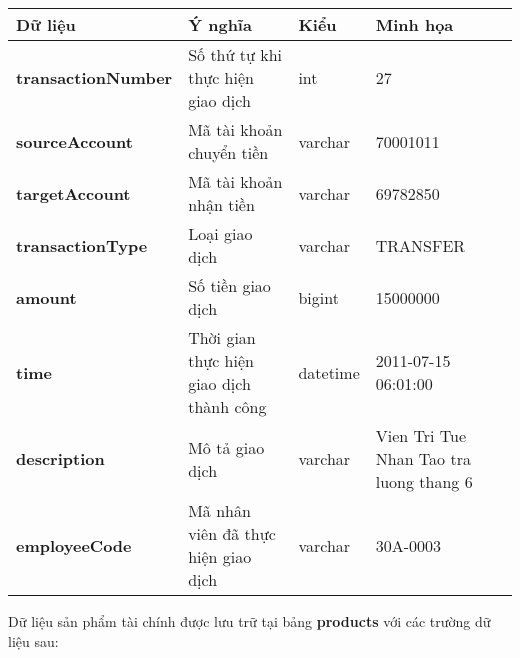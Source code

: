 \begin{center}
    \begin{tabular}{ | m{9em} | m{15em}| m{5em} | m{5em} | } 
    \hline
    \rowcolor{gray!30}
    Dữ liệu & Ý nghĩa & Kiểu & Minh họa \\ 

    \hline
    \textbf{transactionNumber} &
    Số thứ tự khi thực hiện giao dịch &
    int &
    27 \\

    \hline
    \textbf{sourceAccount} &
    Mã tài khoản chuyển tiền &
    varchar &
    70001011 \\

    \hline
    \textbf{targetAccount} &
    Mã tài khoản nhận tiền &
    varchar &
    69782850 \\

    \hline
    \textbf{transactionType} &
    Loại giao dịch &
    varchar &
    TRANSFER \\

    \hline
    \textbf{amount} &
    Số tiền giao dịch &
    bigint &
    15000000 \\

    \hline
    \textbf{time} &
    Thời gian thực hiện giao dịch thành công &
    datetime &
    2011-07-15 06:01:00 \\

    \hline
    \textbf{description} &
    Mô tả giao dịch &
    varchar &
    Vien Tri Tue Nhan Tao tra luong thang 6 \\

    \hline
    \textbf{employeeCode} &
    Mã nhân viên đã thực hiện giao dịch &
    varchar &
    30A-0003 \\

    
    \hline
    \end{tabular}
\end{center}

\noindent
Dữ liệu sản phẩm tài chính được lưu trữ tại bảng \textbf{products} với các trường dữ liệu sau:

\renewcommand{\arraystretch}{2} %
\setlength{\tabcolsep}{10pt}

